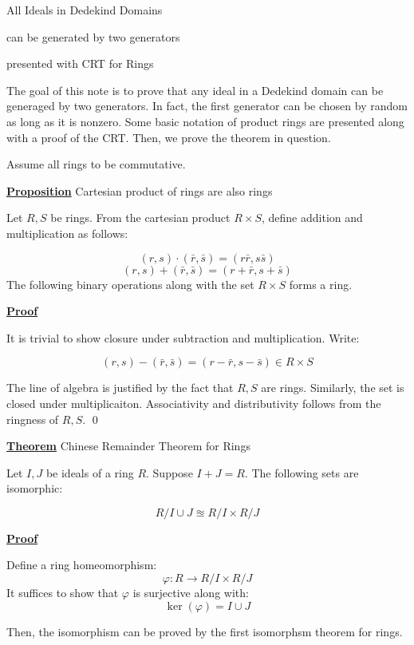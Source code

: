 \documentclass{article}
\newcommand{\new}[1]{
    \vspace{2mm}
    \noindent
    \textbf{
    \underline{#1}}
}
\newcommand{\Proof}{{
    \vspace{2mm}
    \noindent
    \textbf{
    \underline{Proof}}
}
}
\newcommand{\<}{{{
    \langle
}}}
\begin{document}
    \begin{center}
        \LARGE
        All Ideals in Dedekind Domains 
        
        can be generated by two generators

        \Large 
        presented with CRT for Rings
    \end{center}

    The goal of this note is to prove that any ideal in a 
    Dedekind domain can be generaged by two generators. In 
    fact, the first generator can be chosen by random as 
    long as it is nonzero. Some basic notation of product 
    rings are presented along with a proof of the CRT. Then, 
    we prove the theorem in question. 

    Assume all rings to be commutative. 

    \new{Proposition} Cartesian product of rings are also rings

    Let $R, S$ be rings. From the cartesian product $R\times S$, 
    define addition and multiplication as follows:

    \[
        (r, s) \cdot (\bar{r}, \bar{s})
        = (r\bar{r}, s\bar{s})
    \]
  \[
        (r, s) + (\bar{r}, \bar{s})
        = (r+\bar{r}, s+\bar{s})
    \]
    The following binary operations along with the set $R \times S$ 
    forms a ring. 

    \Proof
    It is trivial to show closure under subtraction and 
    multiplication. Write:

    \[
        (r, s) - (\bar{r}, \bar{s}) = (r - \bar{r}, s - \bar{s})
        \in R \times S 
    \]

    The line of algebra is justified by the fact that $R, S$ are rings. 
    Similarly, the set is closed under multiplicaiton. Associativity 
    and distributivity follows from the ringness of $R, S$. 
    \qed 
    
    \new{Theorem} Chinese Remainder Theorem for Rings 

    Let $I, J$ be ideals of a ring $R$. Suppose 
    $I + J = R$. The following sets 
    are isomorphic:

    \[
        R/I\cup J \approxeq R/I \times R/J
    \]

    \new{Proof}
    Define a ring homeomorphism:
    \[
        \varphi: R \rightarrow R/I \times R/J
    \]
    It suffices to show that $\varphi$ is surjective along with:
    \[
        \ker(\varphi) = I \cup J
    \]
    
    Then, the isomorphism can be proved by the first isomorphsm theorem 
    for rings. 
\end{document}
